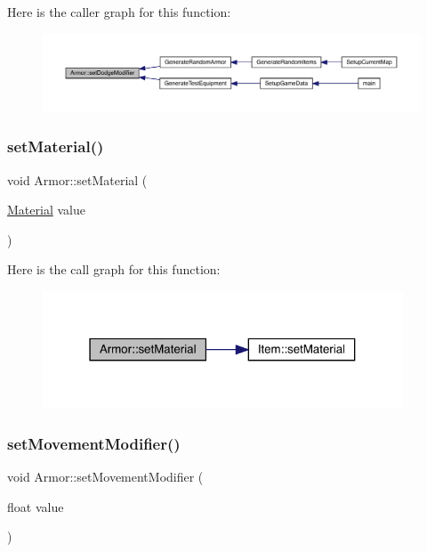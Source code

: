 Here is the caller graph for this function\+:
\nopagebreak
\begin{figure}[H]
\begin{center}
\leavevmode
\includegraphics[width=350pt]{class_armor_ab48309e3f16d226d56af617c65350698_icgraph}
\end{center}
\end{figure}
\mbox{\label{class_armor_a1710521cbba1bf9328e969cbbc8cdbf3}} 
\subsubsection{\texorpdfstring{set\+Material()}{setMaterial()}}
{\footnotesize\ttfamily void Armor\+::set\+Material (\begin{DoxyParamCaption}\item[{\mbox{\hyperlink{class_material}{Material}}}]{value }\end{DoxyParamCaption})}

Here is the call graph for this function\+:
\nopagebreak
\begin{figure}[H]
\begin{center}
\leavevmode
\includegraphics[width=304pt]{class_armor_a1710521cbba1bf9328e969cbbc8cdbf3_cgraph}
\end{center}
\end{figure}
\mbox{\label{class_armor_a99475fc688add41f89b7fef160534e33}} 
\subsubsection{\texorpdfstring{set\+Movement\+Modifier()}{setMovementModifier()}}
{\footnotesize\ttfamily void Armor\+::set\+Movement\+Modifier (\begin{DoxyParamCaption}\item[{float}]{value }\end{DoxyParamCaption})}


